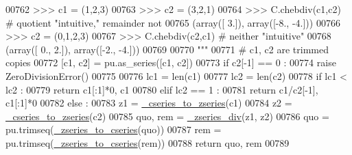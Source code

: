 \begin{DoxyCode}
00762 \textcolor{stringliteral}{    >>> c1 = (1,2,3)}
00763 \textcolor{stringliteral}{    >>> c2 = (3,2,1)}
00764 \textcolor{stringliteral}{    >>> C.chebdiv(c1,c2) # quotient "intuitive," remainder not}
00765 \textcolor{stringliteral}{    (array([ 3.]), array([-8., -4.]))}
00766 \textcolor{stringliteral}{    >>> c2 = (0,1,2,3)}
00767 \textcolor{stringliteral}{    >>> C.chebdiv(c2,c1) # neither "intuitive"}
00768 \textcolor{stringliteral}{    (array([ 0.,  2.]), array([-2., -4.]))}
00769 \textcolor{stringliteral}{}
00770 \textcolor{stringliteral}{    """}
00771     \textcolor{comment}{# c1, c2 are trimmed copies}
00772     [c1, c2] = pu.as\_series([c1, c2])
00773     \textcolor{keywordflow}{if} c2[-1] == 0 :
00774         \textcolor{keywordflow}{raise} ZeroDivisionError()
00775 
00776     lc1 = len(c1)
00777     lc2 = len(c2)
00778     \textcolor{keywordflow}{if} lc1 < lc2 :
00779         \textcolor{keywordflow}{return} c1[:1]*0, c1
00780     \textcolor{keywordflow}{elif} lc2 == 1 :
00781         \textcolor{keywordflow}{return} c1/c2[-1], c1[:1]*0
00782     \textcolor{keywordflow}{else} :
00783         z1 = \hyperlink{namespacepyneb_1_1utils_1_1chebyshev_a659e346f7cdd9fd058850b26f7e95b17}{\_cseries\_to\_zseries}(c1)
00784         z2 = \hyperlink{namespacepyneb_1_1utils_1_1chebyshev_a659e346f7cdd9fd058850b26f7e95b17}{\_cseries\_to\_zseries}(c2)
00785         quo, rem = \hyperlink{namespacepyneb_1_1utils_1_1chebyshev_ad00f2653194746fa98c3421eb7c26f2c}{\_zseries\_div}(z1, z2)
00786         quo = pu.trimseq(\hyperlink{namespacepyneb_1_1utils_1_1chebyshev_a2a88474ce0ea12fb26f82b7116752dc1}{\_zseries\_to\_cseries}(quo))
00787         rem = pu.trimseq(\hyperlink{namespacepyneb_1_1utils_1_1chebyshev_a2a88474ce0ea12fb26f82b7116752dc1}{\_zseries\_to\_cseries}(rem))
00788         \textcolor{keywordflow}{return} quo, rem
00789 
\end{DoxyCode}
\hypertarget{namespacepyneb_1_1utils_1_1chebyshev_a6bb5eb95525fd0572aea52fcd2a12c6c}{}

